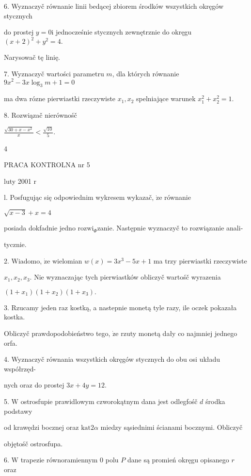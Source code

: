 \documentclass[a4paper,12pt]{article}
\begin{document}
6. Wyznaczyč równanie linii bedącej zbiorem środków wszystkich okręgów stycznych

do prostej $y=0\mathrm{i}$ jednocześnie stycznych zewnętrznie do okręgu $(x+2)^{2}+y^{2}=4.$

Narysowač tę linię.

7. Wyznaczyč wartości parametru $m$, dla których równanie $9x^{2}-3x\log_{3}m+1 =0$

ma dwa rózne pierwiastki rzeczywiste $x_{1}, x_{2}$ spelniające warunek $x_{1}^{2}+x_{2}^{2}=1.$

8. Rozwiązač nierównośč

$\displaystyle \frac{\sqrt{30+x-x^{2}}}{x}<\frac{\sqrt{10}}{5}.$

4





PRACA KONTROLNA nr 5

luty 2001 $\mathrm{r}$

l. Posfugując się odpowiednim wykresem wykazač, $\dot{\mathrm{z}}\mathrm{e}$ równanie

$\sqrt{x-3}+x=4$

posiada dokfadnie jedno $\mathrm{r}\mathrm{o}\mathrm{z}\mathrm{w}\mathrm{i}_{\Phi}$zanie. Następnie wyznaczyč to rozwiązanie anali-

tycznie.

2. Wiadomo, $\dot{\mathrm{z}}\mathrm{e}$ wielomian $w(x) = 3x^{3}-5x+1$ ma trzy pierwiastki rzeczywiste

$x_{1}, x_{2}, x_{3}$. Nie wyznaczając tych pierwiastków obliczyč wartośč wyrazenia

$(1+x_{1})(1+x_{2})(1+x_{3}).$

3. Rzucamy jeden raz kostką, a nastepnie monetą tyle razy, ile oczek pokazała kostka.

Obliczyč prawdopodobieństwo tego, $\dot{\mathrm{z}}\mathrm{e}$ rzuty monetą dały co najmniej jednego orfa.

4. Wyznaczyč równania wszystkich okręgów stycznych do obu osi układu współrzęd-

nych oraz do prostej $3x+4y=12.$

5. $\mathrm{W}$ ostrosfupie prawidlowym czworokątnym dana jest odlegfośč $d$ środka podstawy

od krawędzi bocznej oraz $\mathrm{k}\mathrm{a}\mathrm{t}  2\alpha$ miedzy sąsiednimi ścianami bocznymi. Obliczyč

objętośč ostrosfupa.

6. $\mathrm{W}$ trapezie równoramiennym $0$ polu $P$ dane są promień okręgu opisanego $r$ oraz
\end{document}
